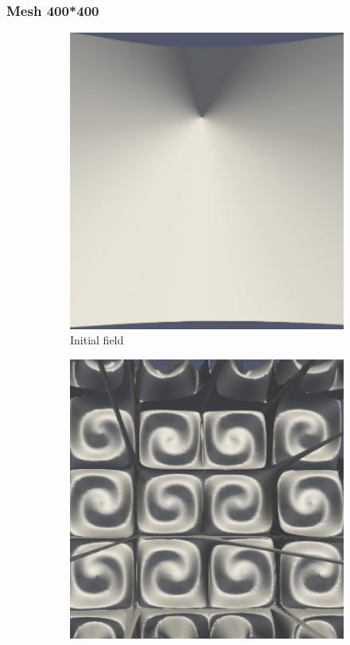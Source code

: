 \documentclass{article}
\begin{document}
\subsubsection{Mesh 400*400}
\begin{figure}[hbt!]
  \begin{subfigure}{0.4\textwidth}
        \centering
        \includegraphics[width=\textwidth]{Figures/e-5 400x400/for n 1.png}
        \caption{Initial field}
  \end{subfigure}
  \hfill
  \begin{subfigure}{0.4\textwidth}
        \centering
        \includegraphics[width=\textwidth]{Figures/e-5 400x400/for n 100.png}

\end{subfigure}
\end{figure}
\end{document}
